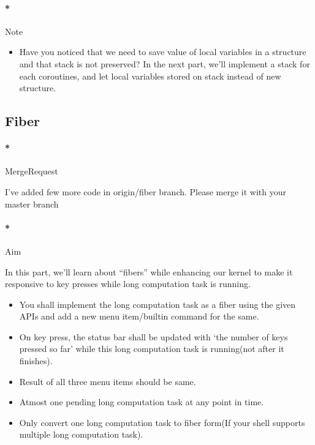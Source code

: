 \documentclass[]{article}
\newenvironment{Shaded}{}{}
\newcommand{\ExtensionTok}[1]{{#1}}
\newcommand{\NormalTok}[1]{{#1}}
\providecommand{\tightlist}{%
  \setlength{\itemsep}{0pt}\setlength{\parskip}{0pt}}
\let\oldparagraph\paragraph
\renewcommand{\paragraph}[1]{\oldparagraph{#1}\mbox{}}
\begin{document}
\paragraph*{Note}\label{note-6}

\begin{itemize}
\tightlist
\item
  Have you noticed that we need to save value of local variables in a
  structure and that stack is not preserved? In the next part, we'll
  implement a stack for each coroutines, and let local variables stored
  on stack instead of new structure.
\end{itemize}

\subsection{Fiber}\label{fiber}

\paragraph*{MergeRequest}\label{mergerequest-5}

I've added few more code in origin/fiber branch. Please merge it with
your master branch

\begin{Shaded}
\end{Shaded}

\paragraph*{Aim}\label{aim-5}

In this part, we'll learn about ``fibers'' while enhancing our kernel to
make it responsive to key presses while long computation task is
running.

\begin{itemize}
\tightlist
\item
  You shall implement the long computation task as a fiber using the
  given APIs and add a new menu item/builtin command for the same.
\item
  On key press, the status bar shall be updated with `the number of keys
  pressed so far' while this long computation task is running(not after
  it finishes).
\item
  Result of all three menu items should be same.
\item
  Atmost one pending long computation task at any point in time.
\item
  Only convert one long computation task to fiber form(If your shell
  supports multiple long computation task).
\end{itemize}
\end{document}
